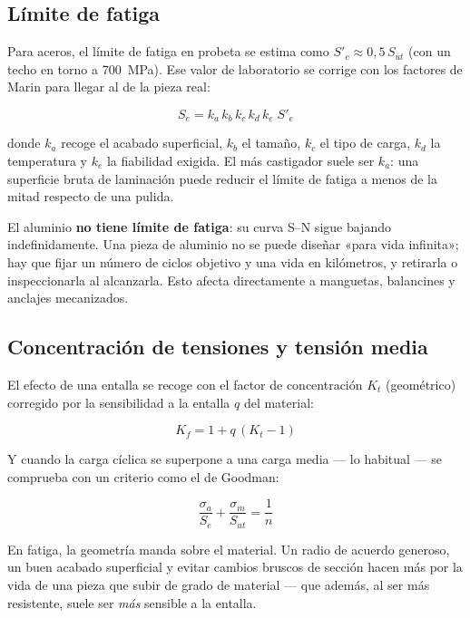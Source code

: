 \subsection{Límite de fatiga}

Para aceros, el límite de fatiga en probeta se estima como
$S'_e \approx 0{,}5\,S_{ut}$ (con un techo en torno a \SI{700}{\mega\pascal}). Ese
valor de laboratorio se corrige con los factores de Marin para llegar al de la
pieza real:

\begin{equation}
  S_e = k_a\,k_b\,k_c\,k_d\,k_e\; S'_e
  \label{eq:marin}
\end{equation}

donde $k_a$ recoge el acabado superficial, $k_b$ el tamaño, $k_c$ el tipo de
carga, $k_d$ la temperatura y $k_e$ la fiabilidad exigida. El más castigador
suele ser $k_a$: una superficie bruta de laminación puede reducir el límite de
fatiga a menos de la mitad respecto de una pulida.

\begin{ojo}
El aluminio \textbf{no tiene límite de fatiga}: su curva S--N sigue bajando
indefinidamente. Una pieza de aluminio no se puede diseñar «para vida infinita»;
hay que fijar un número de ciclos objetivo y una vida en kilómetros, y retirarla
o inspeccionarla al alcanzarla. Esto afecta directamente a manguetas, balancines
y anclajes mecanizados.
\end{ojo}

\subsection{Concentración de tensiones y tensión media}

El efecto de una entalla se recoge con el factor de concentración $K_t$
(geométrico) corregido por la sensibilidad a la entalla $q$ del material:

\begin{equation}
  K_f = 1 + q\,(K_t - 1)
  \label{eq:kf}
\end{equation}

Y cuando la carga cíclica se superpone a una carga media --- lo habitual --- se
comprueba con un criterio como el de Goodman:

\begin{equation}
  \frac{\sigma_a}{S_e} + \frac{\sigma_m}{S_{ut}} = \frac{1}{n}
  \label{eq:goodman}
\end{equation}

\begin{clave}
En fatiga, la geometría manda sobre el material. Un radio de acuerdo generoso, un
buen acabado superficial y evitar cambios bruscos de sección hacen más por la
vida de una pieza que subir de grado de material --- que además, al ser más
resistente, suele ser \emph{más} sensible a la entalla.
\end{clave}

